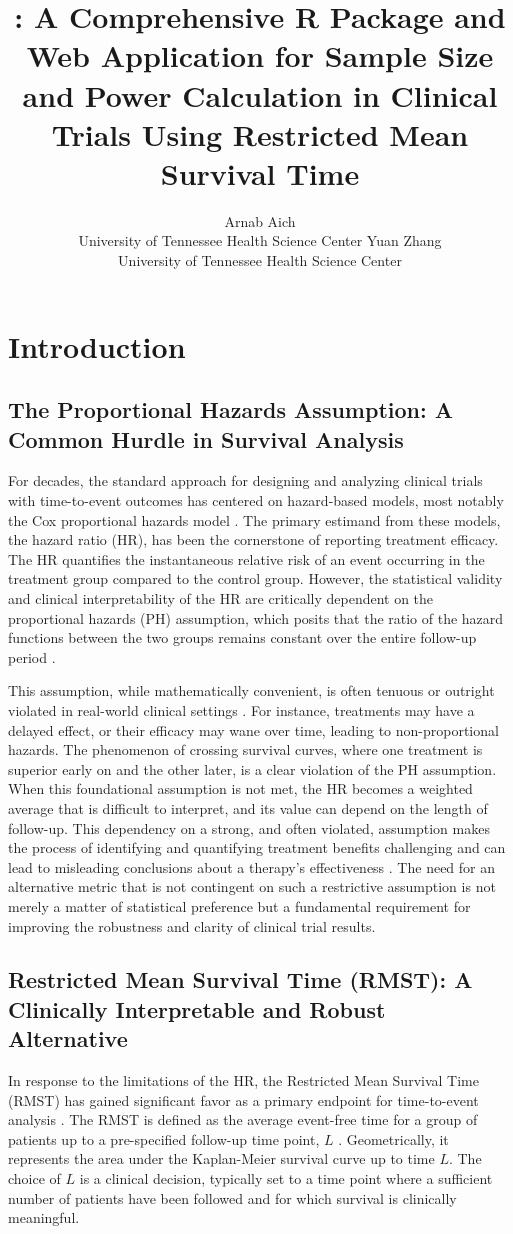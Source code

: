\documentclass[article]{jss}
\title{\pkg{RMSTSS}: A Comprehensive R Package and Web Application for Sample Size and Power Calculation in Clinical Trials Using Restricted Mean Survival Time}
\author{Arnab Aich\\University of Tennessee Health Science Center
  \And Yuan Zhang\\University of Tennessee Health Science Center}
\begin{document}
\section{Introduction}

\subsection{The Proportional Hazards Assumption: A Common Hurdle in Survival Analysis}
For decades, the standard approach for designing and analyzing clinical trials with time-to-event outcomes has centered on hazard-based models, most notably the Cox proportional hazards model \cite{[1]}. The primary estimand from these models, the hazard ratio (HR), has been the cornerstone of reporting treatment efficacy. The HR quantifies the instantaneous relative risk of an event occurring in the treatment group compared to the control group. However, the statistical validity and clinical interpretability of the HR are critically dependent on the proportional hazards (PH) assumption, which posits that the ratio of the hazard functions between the two groups remains constant over the entire follow-up period \cite{[1]}.

This assumption, while mathematically convenient, is often tenuous or outright violated in real-world clinical settings \cite{[1]}. For instance, treatments may have a delayed effect, or their efficacy may wane over time, leading to non-proportional hazards. The phenomenon of crossing survival curves, where one treatment is superior early on and the other later, is a clear violation of the PH assumption. When this foundational assumption is not met, the HR becomes a weighted average that is difficult to interpret, and its value can depend on the length of follow-up. This dependency on a strong, and often violated, assumption makes the process of identifying and quantifying treatment benefits challenging and can lead to misleading conclusions about a therapy's effectiveness \cite{[1]}. The need for an alternative metric that is not contingent on such a restrictive assumption is not merely a matter of statistical preference but a fundamental requirement for improving the robustness and clarity of clinical trial results.

\subsection{Restricted Mean Survival Time (RMST): A Clinically Interpretable and Robust Alternative}
In response to the limitations of the HR, the Restricted Mean Survival Time (RMST) has gained significant favor as a primary endpoint for time-to-event analysis \cite{royston2013, uno2014}. The RMST is defined as the average event-free time for a group of patients up to a pre-specified follow-up time point, $L$ \cite{[1]}. Geometrically, it represents the area under the Kaplan-Meier survival curve up to time $L$. The choice of $L$ is a clinical decision, typically set to a time point where a sufficient number of patients have been followed and for which survival is clinically meaningful.
\end{document}
